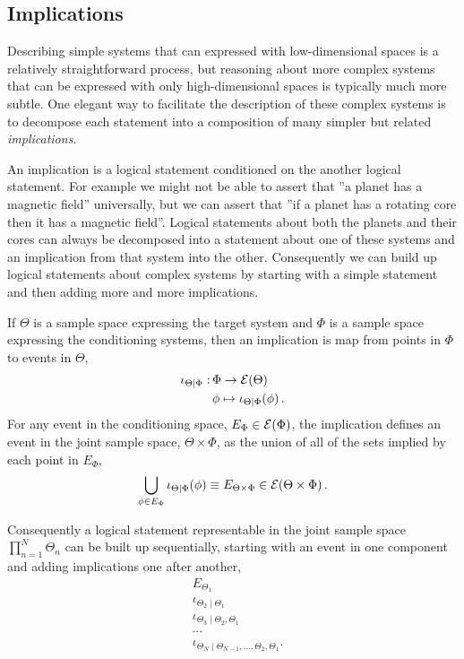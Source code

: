 \subsection{Implications}

Describing simple systems that can expressed with low-dimensional
spaces is a relatively straightforward process, but reasoning about more
complex systems that can be expressed with only high-dimensional
spaces is typically much more subtle.  One elegant way to facilitate the 
description of these complex systems is to decompose each statement
into a composition of many simpler but related \emph{implications}.

An implication is a logical statement conditioned on the another logical
statement.  For example we might not be able to assert that ''a planet
has a magnetic field'' universally, but we can assert that ''if a planet has
a rotating core then it has a magnetic field''.  Logical statements about
both the planets and their cores can always be decomposed into a
statement about one of these systems and an implication from that
system into the other.  Consequently we can build up logical statements
about complex systems by starting with a simple statement and then
adding more and more implications.

If $\Theta$ is a sample space expressing the target system and 
$\Phi$ is a sample space expressing the conditioning systems, then
an implication is map from points in $\Phi$ to events in $\Theta$,
%
\begin{align*}
\iota_{\Theta \mid \Phi} :& \, \Phi \rightarrow  \mathcal{E} \! \left( \Theta \right) 
\\
& \, \phi \mapsto \iota_{\Theta \mid \Phi} \! \left( \phi \right).
\end{align*}
%
For any event in the conditioning space, $E_{\Phi} \in  \mathcal{E} \! \left( \Phi \right) $,
the implication defines an event in the joint sample space, $\Theta \times \Phi$, 
as the union of all of the sets implied by each point in $E_{\Phi}$,
%
\begin{equation*}
\bigcup_{\phi \in E_{\Phi} } \iota_{\Theta \mid \Phi} \! \left( \phi \right)
\equiv
E_{\Theta \times \Phi}
\in
 \mathcal{E} \! \left( \Theta \times \Phi \right) .
\end{equation*}

Consequently a logical statement representable in the joint sample
space $\prod_{n = 1}^{N} \Theta_{n}$ can be built up sequentially, starting with 
an event in one component and adding implications one after another,
%
\begin{align*}
& E_{\Theta_{1}} \\
& \iota_{\Theta_{2} \mid \Theta_{1}} \\
& \iota_{\Theta_{3} \mid \Theta_{2}, \Theta_{1}} \\
& \cdots \\
& \iota_{\Theta_{N} \mid \Theta_{N - 1}, \ldots, \Theta_{2}, \Theta_{1}}.
\end{align*}